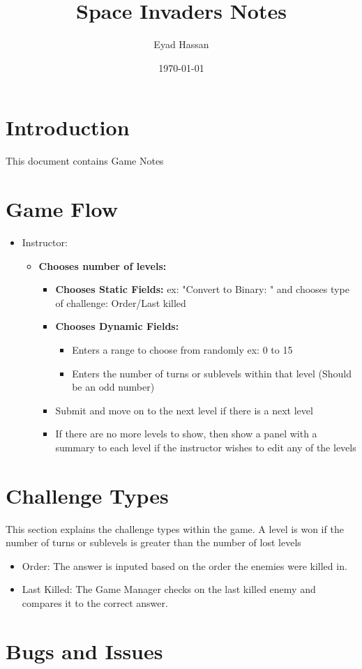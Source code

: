 \documentclass{article}
\title{Space Invaders Notes}
\author{Eyad Hassan}
\date{\today}
\begin{document}
\maketitle

\section{Introduction}
This document contains Game Notes


\newpage

\section{Game Flow}

\begin{itemize}
    \item Instructor:
    \begin{itemize}
        \item \textbf{Chooses number of levels:}
        \begin{itemize}
            \item \textbf{Chooses Static Fields:} ex: "Convert to Binary: " and chooses type of challenge: Order/Last killed
            \item \textbf{Chooses Dynamic Fields:} 
            \begin{itemize}
                \item Enters a range to choose from randomly ex: 0 to 15
                \item Enters the number of turns or sublevels within that level (Should be an odd number)
            \end{itemize}
            \item Submit and move on to the next level if there is a next level
            \item If there are no more levels to show, then show a panel with a summary to each level if the instructor wishes to edit any of the levels
        \end{itemize}
    \end{itemize}
\end{itemize}

\newpage

\section{Challenge Types}
This section explains the challenge types within the game.
A level is won if the number of turns or sublevels is greater than the number of lost levels
\begin{itemize}
    \item Order: The answer is inputed based on the order the enemies were killed in.
    \item Last Killed: The Game Manager checks on the last killed enemy and compares it to the correct answer.
\end{itemize}

\newpage

\section{Bugs and Issues}
\end{document}
